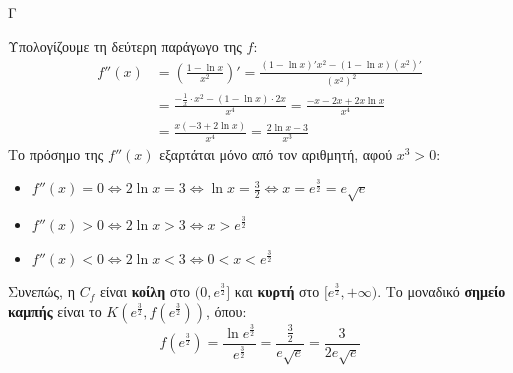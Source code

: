 \begin{thema}{Γ}
\begin{erwthma}
\item Υπολογίζουμε τη δεύτερη παράγωγο της $f$:
\begin{align*}
f''(x) &= \left( \frac{1 - \ln x}{x^2} \right)' = \frac{(1 - \ln x)' x^2 - (1 - \ln x)(x^2)'}{(x^2)^2} \\
&= \frac{-\frac{1}{x} \cdot x^2 - (1 - \ln x) \cdot 2x}{x^4} = \frac{-x - 2x + 2x \ln x}{x^4} \\
&= \frac{x(-3 + 2 \ln x)}{x^4} = \frac{2\ln x - 3}{x^3}
\end{align*}
Το πρόσημο της $f''(x)$ εξαρτάται μόνο από τον αριθμητή, αφού $x^3 > 0$:
\begin{itemize}
    \item $f''(x) = 0 \Leftrightarrow 2\ln x = 3 \Leftrightarrow \ln x = \frac{3}{2} \Leftrightarrow x = e^{\frac{3}{2}} = e\sqrt{e}$
    \item $f''(x) > 0 \Leftrightarrow 2\ln x > 3 \Leftrightarrow x > e^{\frac{3}{2}}$
    \item $f''(x) < 0 \Leftrightarrow 2\ln x < 3 \Leftrightarrow 0 < x < e^{\frac{3}{2}}$
\end{itemize}
\begin{center}
\end{center}
Συνεπώς, η $C_f$ είναι \textbf{κοίλη} στο $(0, e^{\frac{3}{2}}]$ και \textbf{κυρτή} στο $[e^{\frac{3}{2}}, +\infty)$.
Το μοναδικό \textbf{σημείο καμπής} είναι το $K(e^{\frac{3}{2}}, f(e^{\frac{3}{2}}))$, όπου:
\[ f(e^{\frac{3}{2}}) = \frac{\ln e^{\frac{3}{2}}}{e^{\frac{3}{2}}} = \frac{\frac{3}{2}}{e\sqrt{e}} = \frac{3}{2e\sqrt{e}} \]


\end{erwthma}
\end{thema}
